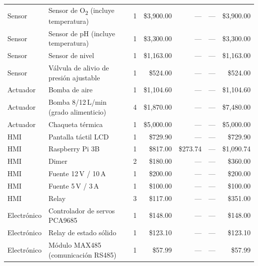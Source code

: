 \begin{longtable}{@{} l p{4.8cm} c r r r r @{}}
Sensor & Sensor de O\textsubscript{2} (incluye temperatura) & 1 & \$3{,}900.00 & --- & --- & \$3{,}900.00 \\
Sensor & Sensor de pH (incluye temperatura)                 & 1 & \$3{,}300.00 & --- & --- & \$3{,}300.00 \\
Sensor & Sensor de nivel                                    & 1 & \$1{,}163.00 & --- & --- & \$1{,}163.00 \\
Sensor & Válvula de alivio de presión ajustable             & 1 &   \$524.00   & --- & --- &   \$524.00   \\
\midrule
Actuador & Bomba de aire                                    & 1 & \$1{,}104.60 & --- & --- & \$1{,}104.60 \\
Actuador & Bomba 8/12\,L/min (grado alimenticio)            & 4 & \$1{,}870.00 & --- & --- & \$7{,}480.00 \\
Actuador & Chaqueta térmica                                 & 1 & \$5{,}000.00 & --- & --- & \$5{,}000.00 \\
\midrule
HMI & Pantalla táctil LCD                                   & 1 &   \$729.90   & ---        & ---      &   \$729.90   \\
HMI & Raspberry Pi 3B                                       & 1 &   \$817.00   & \$273.74   & ---      & \$1{,}090.74 \\
HMI & Dimer                                                 & 2 &   \$180.00   & ---        & ---      &   \$360.00   \\
HMI & Fuente 12\,V / 10\,A                                  & 1 &   \$200.00   & ---        & ---      &   \$200.00   \\
HMI & Fuente 5\,V / 3\,A                                    & 1 &   \$100.00   & ---        & ---      &   \$100.00   \\
HMI & Relay                                                 & 3 &   \$117.00   & ---        & ---      &   \$351.00   \\
\midrule
Electrónico & Controlador de servos PCA9685                 & 1 &   \$148.00   & ---        & ---        &   \$148.00 \\
Electrónico & Relay de estado sólido                        & 1 &   \$123.10   & ---        & ---        &   \$123.10 \\
Electrónico & Módulo MAX485 (comunicación RS485)             & 1 &    \$57.99   & ---        & ---        &    \$57.99 \\

\end{longtable}
